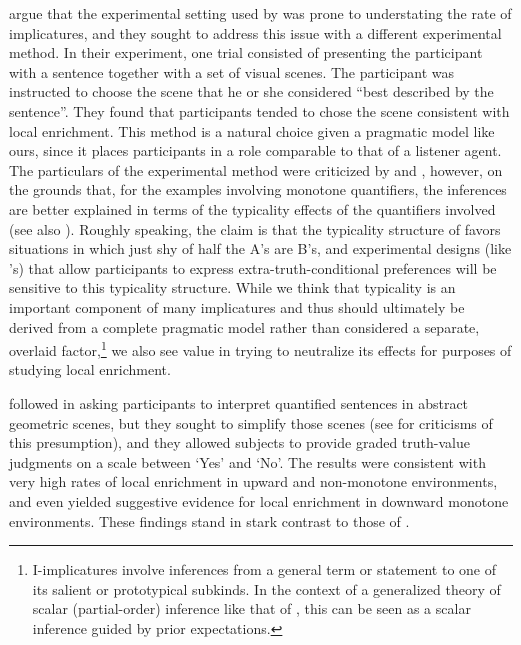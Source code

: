 \documentclass[leqno,12pt]{article}
\begin{document}
\citet{Clifton:Dube:2010} argue that the experimental setting used by
\citeauthor{Geurts:Pouscoulous:2009} was prone to understating the
rate of implicatures, and they sought to address this issue with a
different experimental method.  In their experiment, one trial
consisted of presenting the participant with a sentence together with
a set of visual scenes.  The participant was instructed to choose the
scene that he or she considered ``best described by the sentence''.
They found that participants tended to chose the scene consistent with
local enrichment. This method is a natural choice given a pragmatic
model like ours, since it places participants in a role comparable to
that of a listener agent. The particulars of the experimental method
were criticized by  and
\citet{vanTiel:2014}, however, on the grounds that, for the examples
involving monotone quantifiers, the inferences are better explained in
terms of the typicality effects of the quantifiers involved (see also
\citealt{Degen:Tanenhaus:2014}).  Roughly speaking, the claim is that
the typicality structure of  favors situations in
which just shy of half the A's are B's, and experimental designs (like
\citeauthor{Clifton:Dube:2010}'s) that allow participants to express
extra-truth-conditional preferences will be sensitive to this
typicality structure. While we think that typicality is an important
component of many implicatures and thus should ultimately be derived
from a complete pragmatic model rather than considered a separate,
overlaid factor,\footnote{ I-implicatures
  involve inferences from a general term or statement to one of its
  salient or prototypical subkinds. In the context of a generalized
  theory of scalar (partial-order) inference like that of
  \citet{Hirschberg85}, this can be seen as a scalar inference guided
  by prior expectations.} we also see value in trying to
neutralize its effects for purposes of studying local enrichment.

\citet{Chemla:Spector:2011} followed \citet{Geurts:Pouscoulous:2009}
in asking participants to interpret quantified sentences in abstract
geometric scenes, but they sought to simplify those scenes (see
 for criticisms of this
presumption), and they allowed subjects to provide graded truth-value
judgments on a scale between `Yes' and `No'. The results were
consistent with very high rates of local enrichment in upward and
non-monotone environments, and even yielded suggestive evidence for
local enrichment in downward monotone environments. These findings
stand in stark contrast to those of \citet{Geurts:Pouscoulous:2009}.
\end{document}
